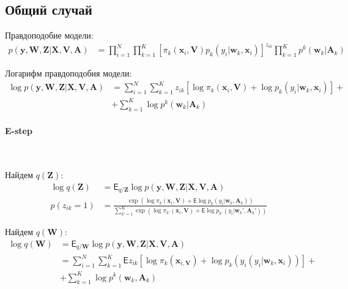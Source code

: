 \documentclass[12pt, twoside]{article}
\numberwithin{equation}{section}
\begin{document}
\subsection{Общий случай}

Правдоподобие модели:
\begin{equation}
\label{eq:st:3}
\begin{aligned}
p\left(\textbf{y}, \textbf{W}, \textbf{Z}|\textbf{X}, \textbf{V}, \textbf{A}\right) &= \prod_{i=1}^{N}\prod_{k=1}^{K}\left[\pi_{k}\left(\textbf{x}_i,\textbf{V}\right)p_k\left(y_i|\textbf{w}_{k}, \textbf{x}_i\right)\right]^{z_{ik}}\prod_{k=1}^{K}p^{k}\left(\textbf{w}_{k}|\textbf{A}_{k}\right)
\end{aligned}
\end{equation}

Логарифм правдоподобия модели:
\begin{equation}
\label{eq:st:4}
\begin{aligned}
\log p\left(\textbf{y}, \textbf{W}, \textbf{Z}|\textbf{X}, \textbf{V}, \textbf{A}\right) &= \sum_{i=1}^{N}\sum_{k=1}^{K}z_{ik}\left[\log\pi_k\left(\textbf{x}_i, \textbf{V}\right) + \log p_k\left(y_i|\textbf{w}_{k}, \textbf{x}_{i}\right)\right] +\\
&+ \sum_{k=1}^{K}\log p^{k}\left(\textbf{w}_k|\textbf{A}_k\right)
\end{aligned}
\end{equation}

\paragraph{E-step}~

Найдем $q\left(\textbf{Z}\right)$:
\begin{equation}
\label{eq:st:5}
\begin{aligned}
\log q\left(\textbf{Z}\right) &= \mathsf{E}_{q/\textbf{Z}}\log p\left(\textbf{y}, \textbf{W}, \textbf{Z}|\textbf{X}, \textbf{V}, \textbf{A}\right) \\
p\left(z_{ik} = 1\right) &= \frac{\exp\left(\log\pi_{k}\left(\textbf{x}_{i}, \textbf{V}\right) + \mathsf{E}\log p_{k}\left(y_i|\textbf{w}_k, \textbf{A}_k\right)\right)}{\sum_{k'=1}^{K}\exp\left(\log\pi_{k'}\left(\textbf{x}_{i}, \textbf{V}\right) + \mathsf{E}\log p_{k'}\left(y_i|\textbf{w}_k', \textbf{A}_k'\right)\right)}
\end{aligned}
\end{equation}

Найдем $q\left(\textbf{W}\right)$:
\begin{equation}
\label{eq:st:6}
\begin{aligned}
\log q\left(\textbf{W}\right) &= \mathsf{E}_{q/\textbf{W}}\log p\left(\textbf{y}, \textbf{W}, \textbf{Z}|\textbf{X}, \textbf{V}, \textbf{A}\right) \\
&= \sum_{i=1}^{N}\sum_{k=1}^{K}\mathsf{E}z_{ik}\left[\log\pi_{k}\left(\textbf{x}_{i, \textbf{V}}\right) + \log p_{k}\left(y_{i}\left(y_{i}|\textbf{w}_{k}, \textbf{x}_i\right)\right)\right] + \\
&+ \sum_{k=1}^{K}\log p^{k}\left(\textbf{w}_{k}, \textbf{A}_{k}\right)
\end{aligned}
\end{equation}
\end{document}
